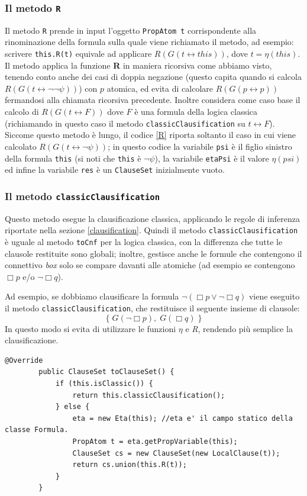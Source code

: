 \documentclass[a4paper,12pt]{report}
\newcommand{\tto} {\leftrightarrow}
\begin{document}
\subsubsection{Il metodo \texttt{R}}
Il metodo \texttt{R} prende in input l'oggetto \texttt{PropAtom t} corrispondente alla rinominazione della formula sulla quale viene richiamato il metodo, ad esempio: scrivere \texttt{this.R(t)} equivale ad applicare $R(G(t \tto this))$, dove $t = \eta(this)$. Il metodo applica la funzione \textbf{R} in maniera ricorsiva come abbiamo visto, tenendo conto anche dei casi di doppia negazione (questo capita quando si calcola $R(G(t \tto \lnot \lnot \psi))$) con $p$ atomica, ed evita di calcolare $R(G(p \tto p))$ fermandosi alla chiamata ricorsiva precedente. Inoltre considera come caso base il calcolo di $R(G(t \tto F))$ dove $F$ è una formula della logica classica (richiamando in questo caso il metodo \texttt{classicClausification} su $t \tto F$). Siccome questo metodo è lungo, il codice \ref{R} riporta soltanto il caso in cui viene calcolato $R(G(t \tto \lnot \psi))$; in questo codice la variabile \texttt{psi} è il figlio sinistro della formula \texttt{this} (si noti che \texttt{this} è $\lnot \psi$), la variabile \texttt{etaPsi} è il valore $\eta(psi)$ ed infine la variabile \texttt{res} è un \texttt{ClauseSet} inizialmente vuoto.

\subsubsection{Il metodo \texttt{classicClausification}}
\label{classicClausification}
Questo metodo esegue la clausificazione classica, applicando le regole di inferenza riportate nella sezione \ref{clausification}. Quindi il metodo \texttt{classicClausification} è uguale al metodo \texttt{toCnf} per la logica classica, con la differenza che tutte le clausole restituite sono globali; inoltre, gestisce anche le formule che contengono il connettivo \emph{box} solo se compare davanti alle atomiche (ad esempio se contengono $\Box p$ e/o $\lnot \Box q$).

Ad esempio, se dobbiamo clausificare la formula $\lnot(\Box p \lor \lnot \Box q)$ viene eseguito il metodo \texttt{classicClausification}, che restituisce il seguente insieme di clausole:
\[
    \{ \; G(\lnot \Box p), \; G(\Box q) \; \}
\]
In questo modo si evita di utilizzare le funzioni $\eta$ e \emph{R}, rendendo più semplice la clausificazione.

\begin{minipage}{\linewidth}
    \begin{lstlisting}[caption={Metodo \texttt{toClauseSet} della classe \texttt{CompoundFormula}}, label={toClauseSet}]
        @Override
        public ClauseSet toClauseSet() {
            if (this.isClassic()) {
                return this.classicClausification();
            } else {
                eta = new Eta(this); //eta e' il campo statico della classe Formula.
                PropAtom t = eta.getPropVariable(this);
                ClauseSet cs = new ClauseSet(new LocalClause(t));
                return cs.union(this.R(t));
            }
        }
    \end{lstlisting}
\end{minipage}
\end{document}
